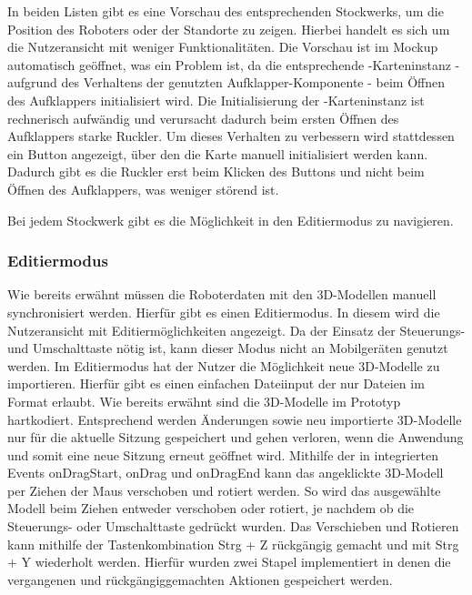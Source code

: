 In beiden Listen gibt es eine Vorschau des entsprechenden Stockwerks, um die Position des Roboters oder der Standorte zu zeigen. Hierbei handelt es sich um die Nutzeransicht mit weniger Funktionalitäten. Die Vorschau ist im Mockup automatisch geöffnet, was ein Problem ist, da die entsprechende \deckgl{}-Karteninstanz - aufgrund des Verhaltens der genutzten Aufklapper-Komponente - beim Öffnen des Aufklappers initialisiert wird. Die Initialisierung der \deckgl{}-Karteninstanz ist rechnerisch aufwändig und verursacht dadurch beim ersten Öffnen des Aufklappers starke Ruckler. Um dieses Verhalten zu verbessern wird stattdessen ein Button angezeigt, über den die Karte manuell initialisiert werden kann. Dadurch gibt es die Ruckler erst beim Klicken des Buttons und nicht beim Öffnen des Aufklappers, was weniger störend ist.

Bei jedem Stockwerk gibt es die Möglichkeit in den Editiermodus zu navigieren.

\subsubsection{Editiermodus}
Wie bereits erwähnt müssen die Roboterdaten mit den 3D-Modellen manuell synchronisiert werden. Hierfür gibt es einen Editiermodus. In diesem wird die Nutzeransicht mit Editiermöglichkeiten angezeigt. Da der Einsatz der Steuerungs- und Umschalttaste nötig ist, kann dieser Modus nicht an Mobilgeräten genutzt werden. Im Editiermodus hat der Nutzer die Möglichkeit neue 3D-Modelle zu importieren. Hierfür gibt es einen einfachen Dateiinput der nur Dateien im \glb{} Format erlaubt. Wie bereits erwähnt sind die 3D-Modelle im Prototyp hartkodiert. Entsprechend werden Änderungen sowie neu importierte 3D-Modelle nur für die aktuelle Sitzung gespeichert und gehen verloren, wenn die Anwendung und somit eine neue Sitzung erneut geöffnet wird. Mithilfe der in \deckgl{} integrierten Events onDragStart, onDrag und onDragEnd kann das angeklickte 3D-Modell per Ziehen der Maus verschoben und rotiert werden.
So wird das ausgewählte Modell beim Ziehen entweder verschoben oder rotiert, je nachdem ob die Steuerungs- oder Umschalttaste gedrückt wurden. Das Verschieben und Rotieren kann mithilfe der Tastenkombination Strg + Z rückgängig gemacht und mit Strg + Y wiederholt werden. Hierfür wurden zwei Stapel implementiert in denen die vergangenen und rückgängiggemachten Aktionen gespeichert werden.

